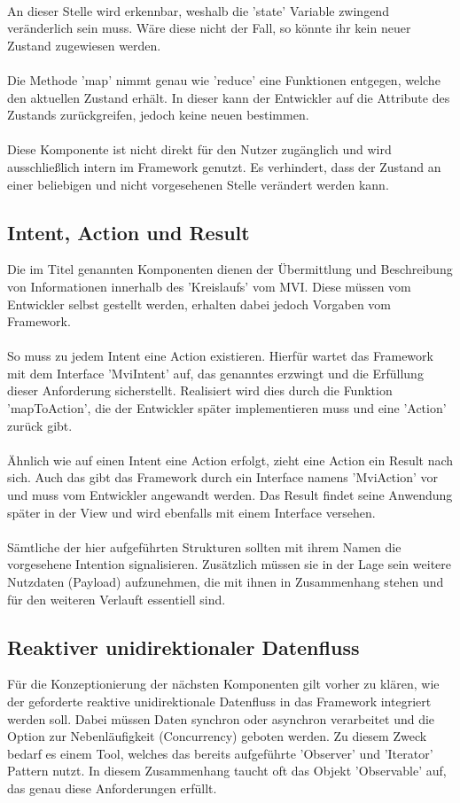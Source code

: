 \\
An dieser Stelle wird erkennbar, weshalb die 'state' Variable zwingend veränderlich sein muss. Wäre diese nicht der Fall, so könnte ihr kein neuer Zustand zugewiesen werden.
\\\\
Die Methode 'map' nimmt genau wie 'reduce' eine Funktionen entgegen, welche den aktuellen Zustand erhält. In dieser kann der Entwickler auf die Attribute des Zustands zurückgreifen, jedoch keine neuen bestimmen.
\\\\
Diese Komponente ist nicht direkt für den Nutzer zugänglich und wird ausschließlich intern im Framework genutzt. Es verhindert, dass der Zustand an einer beliebigen und nicht vorgesehenen Stelle verändert werden kann.

\subsection{Intent, Action und Result}
\label{subsec:intent-action-und-result}
Die im Titel genannten Komponenten dienen der Übermittlung und Beschreibung von Informationen innerhalb des 'Kreislaufs' vom MVI. Diese müssen vom Entwickler selbst gestellt werden, erhalten dabei jedoch Vorgaben vom Framework.
\\\\
So muss zu jedem Intent eine Action existieren. Hierfür wartet das Framework mit dem Interface 'MviIntent' auf, das genanntes erzwingt und die Erfüllung dieser Anforderung sicherstellt. Realisiert wird dies durch die Funktion 'mapToAction', die der Entwickler später implementieren muss und eine 'Action' zurück gibt.  
\\\\
Ähnlich wie auf einen Intent eine Action erfolgt, zieht eine Action ein Result nach sich. Auch das gibt das Framework durch ein Interface namens 'MviAction' vor und muss vom Entwickler angewandt werden. Das Result findet seine Anwendung später in der View und wird ebenfalls mit einem Interface versehen.
\\
\\
Sämtliche der hier aufgeführten Strukturen sollten mit ihrem Namen die vorgesehene Intention signalisieren. Zusätzlich müssen sie in der Lage sein weitere Nutzdaten (Payload) aufzunehmen, die mit ihnen in Zusammenhang stehen und für den weiteren Verlauft essentiell sind.

\subsection{Reaktiver unidirektionaler Datenfluss}
\label{subsec:reaktiver-unidirektionaler-datenfluss}
Für die Konzeptionierung der nächsten Komponenten gilt vorher zu klären, wie der geforderte reaktive unidirektionale Datenfluss in das Framework integriert werden soll. Dabei müssen Daten synchron oder asynchron verarbeitet und die Option zur Nebenläufigkeit (Concurrency) geboten werden. Zu diesem Zweck bedarf es einem Tool, welches das bereits aufgeführte 'Observer' und 'Iterator' Pattern nutzt. In diesem Zusammenhang taucht oft das Objekt 'Observable' auf, das genau diese Anforderungen erfüllt.  


